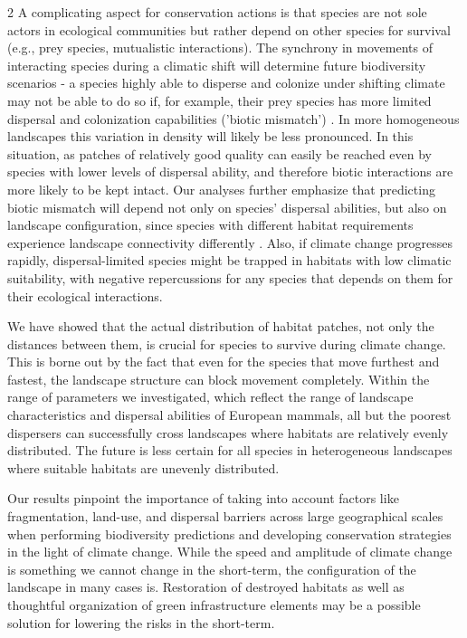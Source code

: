 \documentclass[12pt,pdftex]{article}
\begin{document}
\begin{spacing}{2}
A complicating aspect for conservation actions is that species are not sole actors in ecological communities but rather depend on other species for survival (e.g., prey species, mutualistic interactions). The synchrony in movements of interacting species during a climatic shift will determine future biodiversity scenarios - a species highly able to disperse and colonize under shifting climate may not be able to do so if, for example, their prey species has more limited dispersal and colonization capabilities ('biotic mismatch')  \citep{Chivers2017}. In more homogeneous landscapes this variation in density will likely be less pronounced. In this situation, as patches of relatively good quality can easily be reached even by species with lower levels of dispersal ability, and therefore biotic interactions are more likely to be kept intact. Our analyses further emphasize that predicting biotic mismatch will depend not only on species' dispersal abilities, but also on landscape configuration, since species with different habitat requirements experience landscape connectivity differently  \citep{Taylor1993}. Also, if climate change progresses rapidly, dispersal-limited species might be trapped in habitats with low climatic suitability, with negative repercussions for any species that depends on them for their ecological interactions.

We have showed that the actual distribution of habitat patches, not only the distances between them, is crucial for species to survive during climate change. This is borne out by the fact that even for the species that move furthest and fastest, the landscape structure can block movement completely. Within the range of parameters we investigated, which reflect the range of landscape characteristics and dispersal abilities of European mammals, all but the poorest dispersers can successfully cross landscapes where habitats are relatively evenly distributed. The future is less certain for all species in heterogeneous landscapes where suitable habitats are unevenly distributed. 


Our results pinpoint the importance of taking into account factors like fragmentation, land-use, and dispersal barriers across large geographical scales when performing biodiversity predictions and developing conservation strategies in the light of climate change. While the speed and amplitude of climate change is something we cannot change in the short-term, the configuration of the landscape in many cases is. Restoration of destroyed habitats as well as thoughtful organization of green infrastructure elements  \citep{Benedict2006} may be a possible solution for lowering the risks in the short-term.



\end{spacing}
\end{document}
